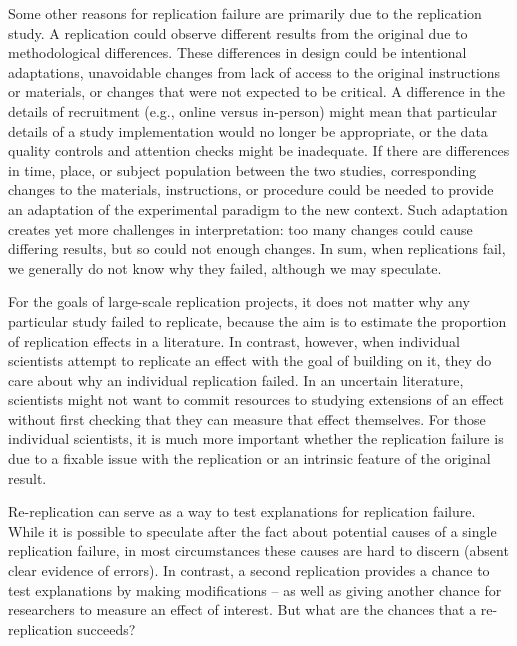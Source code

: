 \documentclass[
  english,
  a4paper,
]{article}
\begin{document}
Some other reasons for replication failure are primarily due to the replication study.
A replication could observe different results from the original due to methodological differences.
These differences in design could be intentional adaptations, unavoidable changes from lack of access to the original instructions or materials, or changes that were not expected to be critical.
A difference in the details of recruitment (e.g., online versus in-person) might mean that particular details of a study implementation would no longer be appropriate, or the data quality controls and attention checks might be inadequate.
If there are differences in time, place, or subject population between the two studies, corresponding changes to the materials, instructions, or procedure could be needed to provide an adaptation of the experimental paradigm to the new context.
Such adaptation creates yet more challenges in interpretation: too many changes could cause differing results, but so could not enough changes.
In sum, when replications fail, we generally do not know why they failed, although we may speculate.

For the goals of large-scale replication projects, it does not matter why any particular study failed to replicate, because the aim is to estimate the proportion of replication effects in a literature.
In contrast, however, when individual scientists attempt to replicate an effect with the goal of building on it, they do care about why an individual replication failed.
In an uncertain literature, scientists might not want to commit resources to studying extensions of an effect without first checking that they can measure that effect themselves.
For those individual scientists, it is much more important whether the replication failure is due to a fixable issue with the replication or an intrinsic feature of the original result.

Re-replication can serve as a way to test explanations for replication failure.
While it is possible to speculate after the fact about potential causes of a single replication failure, in most circumstances these causes are hard to discern (absent clear evidence of errors).
In contrast, a second replication provides a chance to test explanations by making modifications -- as well as giving another chance for researchers to measure an effect of interest.
But what are the chances that a re-replication succeeds?
\end{document}
